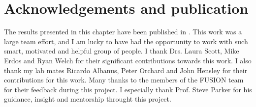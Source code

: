 \section{Acknowledgements and publication}
The results presented in this chapter have been published in \cite{varshneyGeneticRegulatorySignatures2017}. This work was a large team effort, and I am lucky to have had the opportunity to work with such smart, motivated and helpful group of people. I thank Drs. Laura Scott, Mike Erdos and Ryan Welch for their significant contributions towards this work. I also thank my lab mates Ricardo Albanus, Peter Orchard and John Hensley for their contributions for this work. Many thanks to the members of the FUSION team for their feedback during this project. I especially thank Prof. Steve Parker for his guidance, insight and mentorship throught this project.


